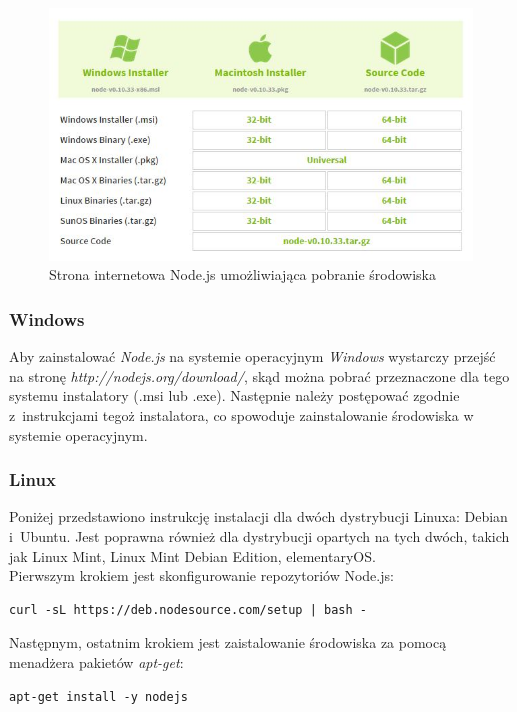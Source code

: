 \documentclass[12pt,a4paper,notitlepage]{article}
\begin{document}
\begin{figure}[H]
    \centering
    \includegraphics[width=\linewidth]{obrazy/node}
    \caption{Strona internetowa Node.js umożliwiająca pobranie środowiska}
\end{figure} 

\subsubsection{Windows}
Aby zainstalować \textit{Node.js} na systemie operacyjnym \textit{Windows} wystarczy przejść na stronę \textit{http://nodejs.org/download/}, skąd można pobrać przeznaczone dla tego systemu instalatory (.msi lub .exe). Następnie należy postępować zgodnie z~instrukcjami tegoż instalatora, co spowoduje zainstalowanie środowiska w systemie operacyjnym.

\subsubsection{Linux}
Poniżej przedstawiono instrukcję instalacji dla dwóch dystrybucji Linuxa: Debian i~Ubuntu. Jest poprawna również dla dystrybucji opartych na tych dwóch, takich jak Linux Mint, Linux Mint Debian Edition, elementaryOS. \\
Pierwszym krokiem jest skonfigurowanie repozytoriów Node.js:
\begin{lstlisting}
curl -sL https://deb.nodesource.com/setup | bash -
\end{lstlisting}

Następnym, ostatnim krokiem jest zaistalowanie środowiska za pomocą menadżera pakietów \textit{apt-get}:
\begin{lstlisting}
apt-get install -y nodejs
\end{lstlisting}
\end{document}
